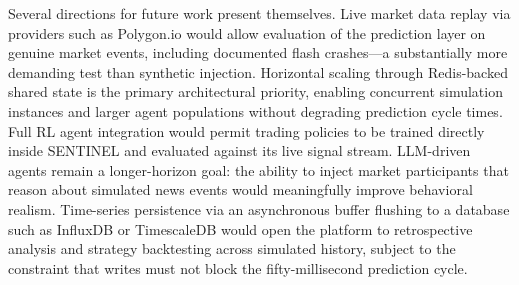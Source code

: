 \documentclass[conference]{IEEEtran}
\begin{document}
Several directions for future work present themselves. Live
market data replay via providers such as Polygon.io would allow
evaluation of the prediction layer on genuine market events, including
documented flash crashes---a substantially more demanding test than
synthetic injection. Horizontal scaling through Redis-backed shared
state is the primary architectural priority, enabling concurrent
simulation instances and larger agent populations without degrading
prediction cycle times. Full RL agent integration would permit
trading policies to be trained directly inside SENTINEL and evaluated
against its live signal stream. LLM-driven agents remain a
longer-horizon goal: the ability to inject market participants that
reason about simulated news events would meaningfully improve
behavioral realism. Time-series persistence via an asynchronous buffer
flushing to a database such as InfluxDB or TimescaleDB would open the
platform to retrospective analysis and strategy backtesting across
simulated history, subject to the constraint that writes must not
block the fifty-millisecond prediction cycle.
\end{document}
